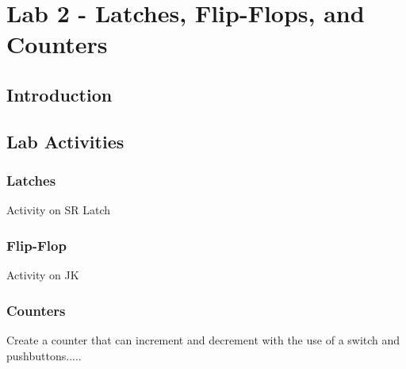 \section{Lab 2 - Latches, Flip-Flops, and Counters}

\subsection{Introduction}

\subsection{Lab Activities}

\subsubsection{Latches}
Activity on SR Latch

\subsubsection{Flip-Flop}
Activity on JK

\subsubsection{Counters}
Create a counter that can increment and decrement with the use of a switch and pushbuttons.....